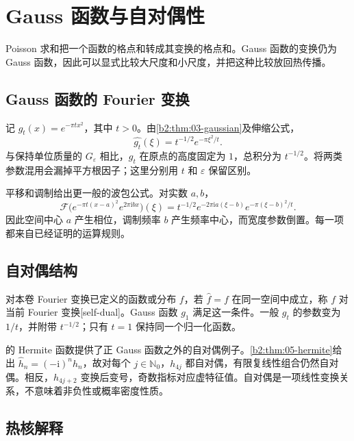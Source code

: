\section{Gauss 函数与自对偶性}
\label{b2:sec:0602}

Poisson 求和把一个函数的格点和转成其变换的格点和。Gauss 函数的变换仍为 Gauss 函数，因此可以显式比较大尺度和小尺度，并把这种比较放回热传播。

\subsection{Gauss 函数的 Fourier 变换}
\label{b2:subsec:060201}

记 \(g_t(x)=e^{-\pi t x^2}\)，其中 \(t>0\)。由\cref{b2:thm:03-gaussian}及伸缩公式，
\[
 \widehat {g_t}(\xi)=t^{-1/2}e^{-\pi\xi^2/t}.
\]
与保持单位质量的 \(G_\varepsilon\) 相比，\(g_t\) 在原点的高度固定为 \(1\)，总积分为 \(t^{-1/2}\)。将两类参数混用会漏掉平方根因子；这里分别用 \(t\) 和 \(\varepsilon\) 保留区别。

\ProseParagraphBreak

平移和调制给出更一般的波包公式。对实数 \(a,b\)，
\[
 \mathcal F\bigl(e^{-\pi t(x-a)^2}e^{2\pi\mathrm{i}bx}\bigr)(\xi)
 =t^{-1/2}e^{-2\pi\mathrm{i}a(\xi-b)}e^{-\pi(\xi-b)^2/t}.
\]
因此空间中心 \(a\) 产生相位，调制频率 \(b\) 产生频率中心，而宽度参数倒置。每一项都来自已经证明的运算规则。

\subsection{自对偶结构}
\label{b2:subsec:060202}

对本卷 Fourier 变换已定义的函数或分布 \(f\)，若 \(\widehat f=f\) 在同一空间中成立，称 \(f\) 对当前 Fourier 变换[self-dual]。Gauss 函数 \(g_1\) 满足这一条件。一般 \(g_t\) 的参数变为 \(1/t\)，并附带 \(t^{-1/2}\)；只有 \(t=1\) 保持同一个归一化函数。

\ProseParagraphBreak

的 Hermite 函数提供了正 Gauss 函数之外的自对偶例子。\cref{b2:thm:05-hermite}给出 \(\widehat h_n=(-\mathrm i)^nh_n\)，故对每个 \(j\in\mathbb N_0\)，\(h_{4j}\) 都自对偶，有限复线性组合仍然自对偶。相反，\(h_{4j+2}\) 变换后变号，奇数指标对应虚特征值。自对偶是一项线性变换关系，不意味着非负性或概率密度性质。

\subsection{热核解释}
\label{b2:subsec:060203}

